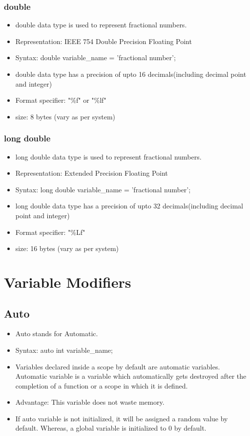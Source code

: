 \subsubsection{double}
\begin{itemize}
    \item double data type is used to represent fractional numbers.
    \item Representation: IEEE 754 Double Precision Floating Point
    \item Syntax: double variable\_name = 'fractional number';
    \item double data type has a precision of upto 16 decimals(including decimal point and integer)
    \item Format specifier: "\%f" or  "\%lf"
    \item size: 8 bytes (vary as per system)
\end{itemize}

\subsubsection{long double}
\begin{itemize}
    \item long double data type is used to represent fractional numbers.
    \item Representation: Extended Precision Floating Point
    \item Syntax: long double variable\_name = 'fractional number';
    \item long double data type has a precision of upto 32 decimals(including decimal point and integer)
    \item Format specifier: "\%Lf"
    \item size: 16 bytes (vary as per system)
\end{itemize}


\section{Variable Modifiers}

\subsection{Auto}
\begin{itemize}
    \item Auto stands for Automatic.
    \item Syntax: auto int variable\_name;
    \item Variables declared inside a scope by default are automatic variables. Automatic variable is a variable which automatically gets destroyed after the completion of a function or a scope in which it is defined.
    \item Advantage: This variable does not waste memory.
    \item If auto variable is not initialized, it will be assigned a random value by default. Whereas, a global variable is initialized to 0 by default.
\end{itemize}

